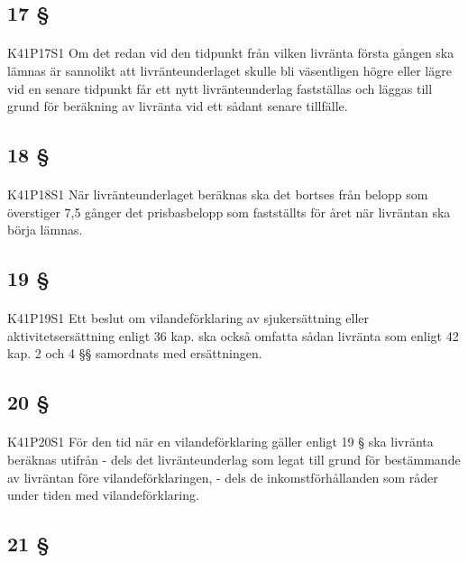 \documentclass[a4paper,notitlepage,openany,10pt]{book}
\begin{document}
\subsection*{17 §}
\paragraph*{}
{\tiny K41P17S1}
Om det redan vid den tidpunkt från vilken livränta första gången ska lämnas är sannolikt att livränteunderlaget skulle bli väsentligen högre eller lägre vid en senare tidpunkt får ett nytt livränteunderlag fastställas och läggas till grund för beräkning av livränta vid ett sådant senare tillfälle.
\subsection*{18 §}
\paragraph*{}
{\tiny K41P18S1}
När livränteunderlaget beräknas ska det bortses från belopp som överstiger 7,5 gånger det prisbasbelopp som fastställts för året när livräntan ska börja lämnas.
\subsection*{19 §}
\paragraph*{}
{\tiny K41P19S1}
Ett beslut om vilandeförklaring av sjukersättning eller aktivitetsersättning enligt 36 kap. ska också omfatta sådan livränta som enligt 42 kap. 2 och 4 §§ samordnats med ersättningen.
\subsection*{20 §}
\paragraph*{}
{\tiny K41P20S1}
För den tid när en vilandeförklaring gäller enligt 19 § ska livränta beräknas utifrån
\newline - dels det livränteunderlag som legat till grund för bestämmande av livräntan före vilandeförklaringen,
\newline - dels de inkomstförhållanden som råder under tiden med vilandeförklaring.
\subsection*{21 §}
\end{document}
